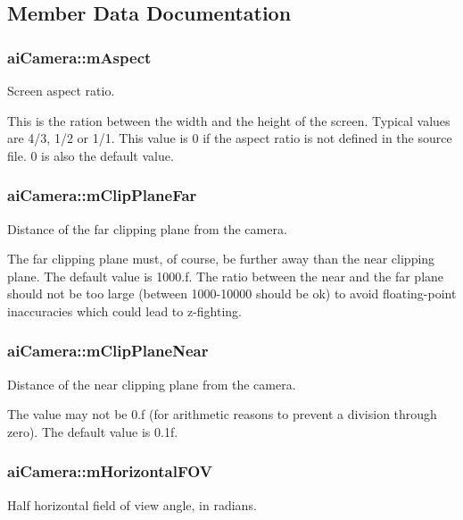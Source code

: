 \subsection{Member Data Documentation}
\hypertarget{structai_camera_ae414556eaa6f910b5927f465d97bf70c}{
\subsubsection[{m\-Aspect}]{ ai\-Camera\-::m\-Aspect}}\label{structai_camera_ae414556eaa6f910b5927f465d97bf70c}
Screen aspect ratio.

This is the ration between the width and the height of the screen. Typical values are 4/3, 1/2 or 1/1. This value is 0 if the aspect ratio is not defined in the source file. 0 is also the default value. \hypertarget{structai_camera_aa9ccf77e3d7ca3dc8f46df931b65172f}{
\subsubsection[{m\-Clip\-Plane\-Far}]{ ai\-Camera\-::m\-Clip\-Plane\-Far}}\label{structai_camera_aa9ccf77e3d7ca3dc8f46df931b65172f}
Distance of the far clipping plane from the camera.

The far clipping plane must, of course, be further away than the near clipping plane. The default value is 1000.\-f. The ratio between the near and the far plane should not be too large (between 1000-\/10000 should be ok) to avoid floating-\/point inaccuracies which could lead to z-\/fighting. \hypertarget{structai_camera_a720e8c94c036dcefe4b13cc1c69c521e}{
\subsubsection[{m\-Clip\-Plane\-Near}]{ ai\-Camera\-::m\-Clip\-Plane\-Near}}\label{structai_camera_a720e8c94c036dcefe4b13cc1c69c521e}
Distance of the near clipping plane from the camera.

The value may not be 0.\-f (for arithmetic reasons to prevent a division through zero). The default value is 0.\-1f. \hypertarget{structai_camera_adcdea73ece19ea0a9068f5544ec23592}{
\subsubsection[{m\-Horizontal\-F\-O\-V}]{ ai\-Camera\-::m\-Horizontal\-F\-O\-V}}\label{structai_camera_adcdea73ece19ea0a9068f5544ec23592}
Half horizontal field of view angle, in radians.


